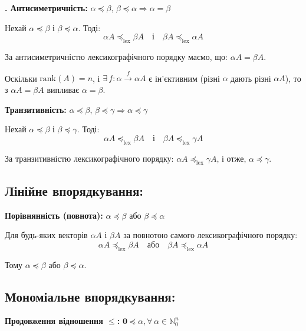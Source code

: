 \noindent \textbf{. Антисиметричність:} $\alpha \preceq \beta, \, \beta \preceq \alpha \Rightarrow \alpha = \beta$

Нехай $\alpha \preceq \beta$ і $\beta \preceq \alpha$. Тоді:
\begin{equation*}
    \alpha A \preceq_{\text{lex}} \beta A \quad \text{і} \quad \beta A \preceq_{\text{lex}} \alpha A
\end{equation*}

За антисиметричністю лексикографічного порядку маємо, що: $\alpha A = \beta A$.

Оскільки $\text{rank}(A) = n$, і $\exists \, f: \alpha \xrightarrow{f} \alpha A$ є ін'єктивним (різні $\alpha$ дають різні $\alpha A$), 
то з $\alpha A = \beta A$ випливає $\alpha = \beta$.

\noindent \textbf{ Транзитивність:} $\alpha \preceq \beta, \, \beta \preceq \gamma \Rightarrow \alpha \preceq \gamma$

Нехай $\alpha \preceq \beta$ і $\beta \preceq \gamma$. Тоді:
\begin{equation*}
    \alpha A \preceq_{\text{lex}} \beta A \quad \text{і} \quad \beta A \preceq_{\text{lex}} \gamma A
\end{equation*}

За транзитивністю лексикографічного порядку: $\alpha A \preceq_{\text{lex}} \gamma A$, і отже, $\alpha \preceq \gamma$.

\subsection{Лінійне впорядкування:}

\textbf{ Порівнянність (повнота):} $\alpha \preceq \beta$ або $\beta \preceq \alpha$

Для будь-яких векторів $\alpha A$ і $\beta A$ за повнотою самого лексикографічного порядку:
\begin{equation*}
    \alpha A \preceq_{\text{lex}} \beta A \quad \text{або} \quad \beta A \preceq_{\text{lex}} \alpha A
\end{equation*}

Тому $\alpha \preceq \beta$ або $\beta \preceq \alpha$.

\subsection{Мономіальне впорядкування:}

\textbf{ Продовження відношення $\leq$:} $\mathbf{0} \preceq \alpha, \forall \, \alpha \in \mathbb{N}_0^n$

